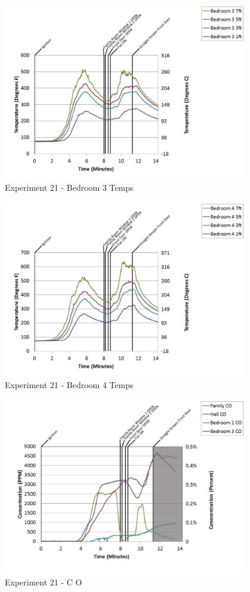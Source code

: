 \documentclass{article}
\begin{document}
\begin{appendices}
	\clearpage

	\begin{figure}[h!]
		\centering
		\includegraphics[height=3.05in]{0_Images/Results_Charts/Exp_21_Charts/Bedroom3Temps.pdf}
		\caption{Experiment 21 - Bedroom 3 Temps}
	\end{figure}
 

	\begin{figure}[h!]
		\centering
		\includegraphics[height=3.05in]{0_Images/Results_Charts/Exp_21_Charts/Bedroom4Temps.pdf}
		\caption{Experiment 21 - Bedroom 4 Temps}
	\end{figure}
 
	\clearpage

	\begin{figure}[h!]
		\centering
		\includegraphics[height=3.05in]{0_Images/Results_Charts/Exp_21_Charts/CO.pdf}
		\caption{Experiment 21 - C O}
	\end{figure}
 


\end{appendices}
\end{document}

